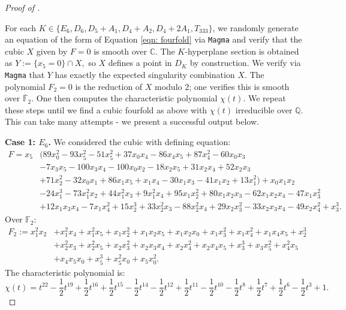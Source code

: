 \documentclass[12pt]{amsart}
\numberwithin{equation}{section}
\theoremstyle{plain}
\theoremstyle{remark}
\theoremstyle{definition}
\newcommand{\bQ}{\mathbb{Q}}
\newcommand{\bF}{\mathbb{F}}
\newcommand{\bC}{\mathbb{C}}
\begin{document}
\begin{proof}[Proof of ]\label{proof: main theorem}
    
    For each $K\in \{E_6, D_6,D_5+A_1,D_4+A_2,D_4+2A_1,T_{333}\}$, we randomly generate an equation of the form of Equation \ref{eqn: fourfold} via \verb|Magma| and verify that the cubic $X$ given by $F=0$ is smooth over $\bC$. 
    The $K$-hyperplane section is obtained as $Y:=\{x_5=0\}\cap X,$ so $X$ defines a point in $D_K$ by construction. 
    We verify via \verb|Magma| that $Y$ has exactly the expected singularity combination $X$. 
    The polynomial $F_2=0$ is the reduction of $X$ modulo $2$; one verifies this is smooth over $\overline{\bF}_2.$ 
    One then computes the characteristic polynomial $\chi(t)$. 
    We repeat these steps until we find a cubic fourfold as above with $\chi(t)$ irreducible over $\bQ$. 
    This can take many attempts - we present a successful output below. 
    
\noindent\textbf{Case 1: $E_6$.}
 We considered the cubic with defining equation:
\begin{equation}\label{ex: E6}
\begin{split}
F =x_5&(89x_0^2-93x_5^2-51x_5^2+37x_0x_4-86x_4x_5+87x_4^2-60x_0x_3\\
       & -7x_3x_5-100x_3x_4-100x_0x_2-18x_2x_5+31x_2x_4+52x_2x_3\\
       &+71x_2^2-32x_0x_1+86x_1x_5+x_1x_4-30x_1x_3-41x_1x_2+13x_1^2)+x_0x_1x_2\\
       & - 24x_1^3 - 73x_1^2x_2 + 44x_1^2x_3 + 9x_1^2x_4 + 95x_1x_2^2 + 
    80x_1x_2x_3 - 62x_1x_2x_4 - 47x_1x_3^2 \\
    &+ 12x_1x_3x_4 - 7x_1x_4^2 + 15x_2^3 +
    33x_2^2x_3 - 88x_2^2x_4 + 29x_2x_3^2 - 33x_2x_3x_4 - 49x_2x_4^2 + x_3^3.
\end{split}
\end{equation}
Over $\bF_2:$
\begin{align*}
F_2:= x_1^2x_2 &+ x_1^2x_4 + x_1^2x_5 + x_1x_2^2 + x_1x_2x_5 + x_1x_2x_0 + x_1x_3^2 + x_1x_4^2 + x_1x_4x_5 + x_2^3 \\
&+ x_2^2x_3 + x_2^2x_5 + x_2x_3^2 + x_2x_3x_4 + x_2x_4^2 + x_2x_4x_5 + x_3^3 + x_3x_5^2 + x_4^2x_5 \\
&+ x_4x_5x_0 + x_5^3 + x_5^2x_0 + x_5x_0^2.
\end{align*}
The characteristic polynomial is:
\[
    \chi(t)=t^{22}-\frac{1}{2}t^{19}+\frac{1}{2}t^{16}+\frac{1}{2}t^{15}-\frac{1}{2}t^{14}-\frac{1}{2}t^{12}+\frac{1}{2}t^{11}-\frac{1}{2}t^{10}-\frac{1}{2}t^8+\frac{1}{2}t^7+\frac{1}{2}t^6-\frac{1}{2}t^3+1.
\]


\end{proof}
\end{document}

